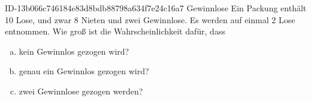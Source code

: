 \begin{exercise}
      {ID-13b066c746184e83d8bdb88798a634f7e24c16a7}
      {Gewinnlose}
  \ifproblem\problem
    Ein Packung enthält 10 Lose, und zwar 8 Nieten und zwei Gewinnlose.
    Es werden auf einmal 2 Lose entnommen. Wie groß ist die Wahrscheinlichkeit
    dafür, dass
    \begin{enumerate}[a)]
      \item kein Gewinnlos gezogen wird?
      \item genau ein Gewinnlos gezogen wird?
      \item zwei Gewinnlose gezogen werden?
    \end{enumerate}
  \fi
\end{exercise}
